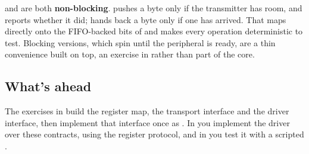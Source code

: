  and  are both \textbf{non-blocking}.  pushes a byte only if
the transmitter has room, and reports whether it did;  hands back a byte only if one
has arrived. That maps directly onto the FIFO-backed  bits of  and makes
every operation deterministic to test. Blocking versions, which spin until the peripheral is ready,
are a thin convenience built on top, an exercise in  rather than part of the core.

\subsection{What's ahead}
The exercises in  build the register map, the transport interface and the
driver interface, then implement that interface once as . In 
you implement the  driver over these contracts, using the register protocol, and in
 you test it with a scripted .
